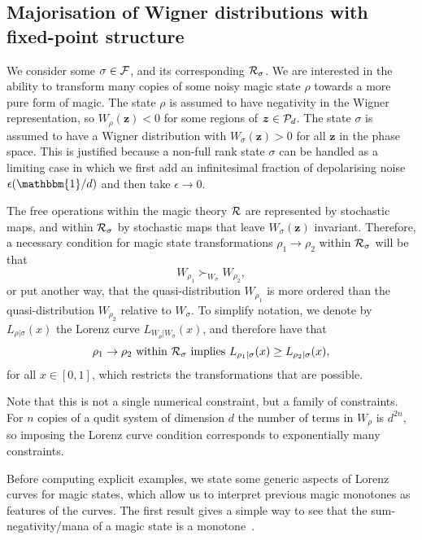 \documentclass[
onecolumn,
superscriptaddress
]{revtex4-1}
\def\id{\mathbbm{1}}
\def\z{\boldsymbol{z}}
\def\R{{\cal R}}
\def\F{{\cal F}}
\renewcommand{\P}{{\cal P}}
\begin{document}
\subsection*{Majorisation of Wigner distributions with fixed-point structure}

We consider some $\sigma \in \F$, and its corresponding $\R_\sigma$. We are interested in the ability to transform many copies of some noisy magic state $\rho$ towards a more pure form of magic. The state $\rho$ is assumed to have negativity in the Wigner representation, so $W_\rho(\z) < 0$ for some regions of $\z \in \P_d$. The state $\sigma$ is assumed to have a Wigner distribution with $W_\sigma(\z) > 0$ for all $\z$ in the phase space.
This is justified because a non-full rank state $\sigma$ can be handled as a limiting case in which we first add an infinitesimal fraction of depolarising noise $\epsilon (\id/d)$ and then take $\epsilon \rightarrow 0$.

The free operations within the magic theory $\R$ are represented by stochastic maps, and within $\R_\sigma$ by stochastic maps that leave $W_\sigma(\z)$ invariant. Therefore, a necessary condition for magic state transformations $\rho_1 \rightarrow \rho_2$ within $\R_\sigma$ will be that 
\begin{equation}
	W_{\rho_1} \succ_{W_{\sigma}} W_{\rho_2},
\end{equation}
or put another way, that the quasi-distribution $W_{\rho_1}$ is more ordered than the quasi-distribution $W_{\rho_2}$ relative to $W_\sigma$. To simplify notation, we denote by $L_{\rho | \sigma}(x)$ the Lorenz curve $L_{W_{\rho} | W_{\sigma}} (x)$, and therefore have that
\begin{equation}
\rho_1 \rightarrow \rho_2 \mbox{ within }\R_\sigma \mbox{ implies } L_{\rho_1 |\sigma} (x) \ge L_{\rho_2 |\sigma} (x),
\end{equation}
for all $x \in [0,1]$, which restricts the transformations that are possible.

Note that this is not a single numerical constraint, but a family of constraints. For $n$ copies of a qudit system of dimension $d$ the number of terms in $W_{\rho}$ is $d^{2n}$, so imposing the Lorenz curve condition corresponds to exponentially many constraints.

Before computing explicit examples, we state some generic aspects of Lorenz curves for magic states, which allow us to interpret previous magic monotones as features of the curves. The first result gives a simple way to see that the sum-negativity/mana of a magic state is a monotone~\cite{cit:veitch2}.
\end{document}
